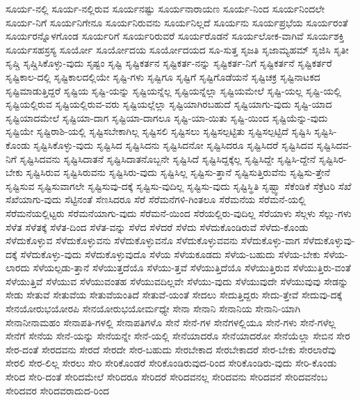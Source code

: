 {ಸೂರ್ಯ-ನಲ್ಲಿ
ಸೂರ್ಯ-ನಲ್ಲಿರುವ
ಸೂರ್ಯನಷ್ಟು
ಸೂರ್ಯನಾರಾಯಣ
ಸೂರ್ಯ-ನಿಂದ
ಸೂರ್ಯನಿಂದಲೇ
ಸೂರ್ಯ-ನಿಗೆ
ಸೂರ್ಯನಿಗೇನೂ
ಸೂರ್ಯನಿರುವನು
ಸೂರ್ಯನಿಲ್ಲದೆ
ಸೂರ್ಯನು
ಸೂರ್ಯಪ್ರಭೆಯ
ಸೂರ್ಯರಂತೆ
ಸೂರ್ಯರನ್ನೊಳಗೊಂಡ
ಸೂರ್ಯರಿಗೆ
ಸೂರ್ಯರಿರುವರೆ
ಸೂರ್ಯರೊಡನೆ
ಸೂರ್ಯಲೋಕ-ವಾಗಿವೆ
ಸೂರ್ಯಶಕ್ತಿ
ಸೂರ್ಯಸಹಸ್ರಸ್ಯ
ಸೂರ್ಯೋ
ಸೂರ್ಯೋದಯ
ಸೂರ್ಯೋದಯದ
ಸೂ-ಸುತ್ತ
ಸೃಜತಿ
ಸೃಜಾಮ್ಯಹಮ್
ಸೃಜಿಸಿ
ಸೃತೀ
ಸೃಷ್ಚಿ
ಸೃಷ್ಚಿಸಿಕೊಳ್ಳು-ವುದು
ಸೃಷ್ಟಂ
ಸೃಷ್ಟಿ
ಸೃಷ್ಟಿಕರ್ತನ
ಸೃಷ್ಟಿಕರ್ತ-ನನ್ನು
ಸೃಷ್ಟಿಕರ್ತ-ನಿಗೆ
ಸೃಷ್ಟಿಕರ್ತನೆ
ಸೃಷ್ಟಿಕರ್ತರೆ
ಸೃಷ್ಟಿಕಾಲ-ದಲ್ಲಿ
ಸೃಷ್ಟಿಕಾಲದಲ್ಲಿಯೇ
ಸೃಷ್ಟಿ-ಗಳು
ಸೃಷ್ಟಿಗೂ
ಸೃಷ್ಟಿಗೆ
ಸೃಷ್ಟಿಗೊಡೆಯನೆ
ಸೃಷ್ಟಿಚಕ್ರ
ಸೃಷ್ಟಿನಾಟಕದ
ಸೃಷ್ಟಿಮಾಡುತ್ತಿದ್ದರೆ
ಸೃಷ್ಟಿಯ
ಸೃಷ್ಟಿ-ಯನ್ನು
ಸೃಷ್ಟಿಯನ್ನೆಲ್ಲ
ಸೃಷ್ಟಿಯನ್ನೆಲ್ಲಾ
ಸೃಷ್ಟಿಯಮೇಲೆ
ಸೃಷ್ಟಿ-ಯಲ್ಲ
ಸೃಷ್ಟಿ-ಯಲ್ಲಿ
ಸೃಷ್ಟಿಯಲ್ಲಿರುವ
ಸೃಷ್ಟಿಯಲ್ಲಿರುವ-ವರು
ಸೃಷ್ಟಿಯಲ್ಲೆಲ್ಲಾ
ಸೃಷ್ಟಿಯಾಗಿರಬಹುದೆ
ಸೃಷ್ಟಿಯಾಗು-ವುದು
ಸೃಷ್ಟಿ-ಯಾದ
ಸೃಷ್ಟಿಯಾದಮೇಲೆ
ಸೃಷ್ಟಿಯಾ-ದಾಗ
ಸೃಷ್ಟಿಯಾ-ದಾಗಲೂ
ಸೃಷ್ಟಿ-ಯಾ-ಯಿತು
ಸೃಷ್ಟಿ-ಯಿಂದ
ಸೃಷ್ಟಿಯೆನ್ನು-ವುದು
ಸೃಷ್ಟಿಯೇ
ಸೃಷ್ಟಿರಾಶಿ-ಯಲ್ಲಿ
ಸೃಷ್ಟಿಸಬೇಕಾಗಿಲ್ಲ
ಸೃಷ್ಟಿಸಲಿ
ಸೃಷ್ಟಿಸಲು
ಸೃಷ್ಟಿಸಲ್ಪಟ್ಟಿತು
ಸೃಷ್ಟಿಸಲ್ಪಟ್ಟಿದೆ
ಸೃಷ್ಟಿಸಿ
ಸೃಷ್ಟಿಸಿ-ಕೊಂಡು
ಸೃಷ್ಟಿಸಿಕೊಳ್ಳು-ವುದು
ಸೃಷ್ಟಿಸಿದ
ಸೃಷ್ಟಿಸಿದನು
ಸೃಷ್ಟಿಸಿದನೋ
ಸೃಷ್ಟಿಸಿದರೂ
ಸೃಷ್ಟಿಸಿದರೆ
ಸೃಷ್ಟಿಸಿದವ
ಸೃಷ್ಟಿಸಿದವ-ನಿಗೆ
ಸೃಷ್ಟಿಸಿದವನು
ಸೃಷ್ಟಿಸಿದಾತನೆ
ಸೃಷ್ಟಿಸಿದಾತನೊಬ್ಬನೇ
ಸೃಷ್ಟಿಸಿದೆ
ಸೃಷ್ಟಿಸಿದ್ದಕ್ಕೆಲ್ಲ
ಸೃಷ್ಟಿಸಿದ್ದೇ
ಸೃಷ್ಟಿಸಿ-ದ್ದೇನೆ
ಸೃಷ್ಟಿಸಿರ-ಬೇಕು
ಸೃಷ್ಟಿಸಿರುವ
ಸೃಷ್ಟಿಸಿರುವನು
ಸೃಷ್ಟಿಸಿರು-ವುದು
ಸೃಷ್ಟಿಸಿಲ್ಲ
ಸೃಷ್ಟಿಸು-ತ್ತಾನೆ
ಸೃಷ್ಟಿಸುತ್ತಿರುವೆನು
ಸೃಷ್ಟಿಸು-ತ್ತೇನೆ
ಸೃಷ್ಟಿಸುವ
ಸೃಷ್ಟಿಸುವಾಗಲೇ
ಸೃಷ್ಟಿಸುವು-ದಕ್ಕೆ
ಸೃಷ್ಟಿಸು-ವುದಿಲ್ಲ
ಸೃಷ್ಟಿಸು-ವುದು
ಸೃಷ್ಟಿಸ್ಥಿತಿ
ಸೃಷ್ಟ್ವಾ
ಸೆಕೆಂಡಿಕೆ
ಸೆಕ್ರೆಟರಿ
ಸೆಖೆ
ಸೆಖೆಯಾಗು-ವುದು
ಸೆಟ್ಟಿನಂತೆ
ಸೆಣಸಿದರೂ
ಸೆರೆ
ಸೆರೆಮನೆಗಳಿ-ಗಿಂತಲೂ
ಸೆರೆಮನೆಯ
ಸೆರೆಮನೆ-ಯಲ್ಲಿ
ಸೆರೆಮನೆಯಲ್ಲಿಟ್ಟರು
ಸೆರೆಮನೆಯಾಗು-ವುದು
ಸೆರೆಮನೆ-ಯಿಂದ
ಸೆರೆಯಲ್ಲಿರು-ವುದಿಲ್ಲ
ಸೆರೆಯಾಳು
ಸೆಲ್ಗಳು
ಸೆಲ್ಲು-ಗಳು
ಸೆಳೆತ
ಸೆಳೆತಕ್ಕೆ
ಸೆಳೆತ-ದಿಂದ
ಸೆಳೆತ-ವನ್ನು
ಸೆಳೆದ
ಸೆಳೆದರೆ
ಸೆಳೆದು
ಸೆಳೆದುಕೊಂಡಿರುವೆ
ಸೆಳೆದು-ಕೊಂಡು
ಸೆಳೆದುಕೊಳ್ಳುವ
ಸೆಳೆದುಕೊಳ್ಳುವನು
ಸೆಳೆದುಕೊಳ್ಳುವನೊ
ಸೆಳೆದುಕೊಳ್ಳುವವನು
ಸೆಳೆದುಕೊಳ್ಳು-ವಾಗ
ಸೆಳೆದುಕೊಳ್ಳುವು-ದಕ್ಕೆ
ಸೆಳೆದುಕೊಳ್ಳು-ವುದು
ಸೆಳೆದುಕೊಳ್ಳುವುದೊ
ಸೆಳೆಯ
ಸೆಳೆಯಕೂಡದು
ಸೆಳೆಯ-ಬಹುದು
ಸೆಳೆಯ-ಬೇಕು
ಸೆಳೆಯ-ಲಾರದು
ಸೆಳೆಯಲ್ಪಡು-ತ್ತಾನೆ
ಸೆಳೆಯುತ್ತದೆಯೊ
ಸೆಳೆಯು-ತ್ತವೆ
ಸೆಳೆಯುತ್ತಿದೆಯೊ
ಸೆಳೆಯುತ್ತಿರುವ
ಸೆಳೆಯುತ್ತಿರು-ವಂತೆ
ಸೆಳೆಯುತ್ತಿವೆ
ಸೆಳೆಯುವ
ಸೆಳೆಯುವಂತಹ
ಸೆಳೆಯುವದಿಲ್ಲವೇ
ಸೆಳೆಯು-ವುದು
ಸೆಳೆಯುವುದೇ
ಸೆಳೆಯುವುವು
ಸೇಡನ್ನು
ಸೇಡು
ಸೇತುವೆ
ಸೇತುವೆಯ
ಸೇತುವೆಯಂತಿದೆ
ಸೇತುವೆ-ಯಂತೆ
ಸೇದಲು
ಸೇದುತ್ತಿದ್ದರು
ಸೇದು-ತ್ತೇವೆ
ಸೇದುವು-ದಕ್ಕೆ
ಸೇನಯೋರುಭಯೋರಪಿ
ಸೇನಯೋರುಭಯೋರ್ಮಧ್ಯೇ
ಸೇನಾ
ಸೇನಾನಿ
ಸೇನಾನಿಯ
ಸೇನಾನಿ-ಯಾಗಿ
ಸೇನಾನೀನಾಮಹಂ
ಸೇನಾಪತಿ-ಗಳಲ್ಲಿ
ಸೇನಾಪತಿಗಳೊ
ಸೇನೆ
ಸೇನೆ-ಗಳ
ಸೇನೆಗಳಲ್ಲಿಯೂ
ಸೇನೆ-ಗಳು
ಸೇನೆ-ಗಳೆಲ್ಲ
ಸೇನೆಗೆ
ಸೇನೆಯ
ಸೇನೆ-ಯನ್ನು
ಸೇನೆಯನ್ನೇ
ಸೇನೆ-ಯಲ್ಲಿ
ಸೇನೆಯಾದರೊ
ಸೇನೆಯಾದರೋ
ಸೇನೆಯೆಲ್ಲಾ
ಸೇಬಿನ
ಸೇರ
ಸೇರ-ದಂತೆ
ಸೇರದವನು
ಸೇರದೆ
ಸೇರದೇ
ಸೇರ-ಬಹುದು
ಸೇರಬೇಕಾದ
ಸೇರಬೇಕಾದರೆ
ಸೇರ-ಬೇಕು
ಸೇರಲಾರೆವು
ಸೇರಲಿ
ಸೇರ-ಲಿಲ್ಲ
ಸೇರಲು
ಸೇರಿ
ಸೇರಿಕೊಂಡರೆ
ಸೇರಿಕೊಂಡಿರುವುದ-ರಿಂದ
ಸೇರಿಕೊಂಡಿರು-ವುದು
ಸೇರಿ-ಕೊಂಡು
ಸೇರಿದ
ಸೇರಿ-ದಂತೆ
ಸೇರಿದಮೇಲೆ
ಸೇರಿದರೂ
ಸೇರಿದರೆ
ಸೇರಿದವನಲ್ಲ
ಸೇರಿದವನು
ಸೇರಿದವನೆ
ಸೇರಿದವನೆಂಬ
ಸೇರಿದವರ
ಸೇರಿದವರಾದುದ-ರಿಂದ
}
